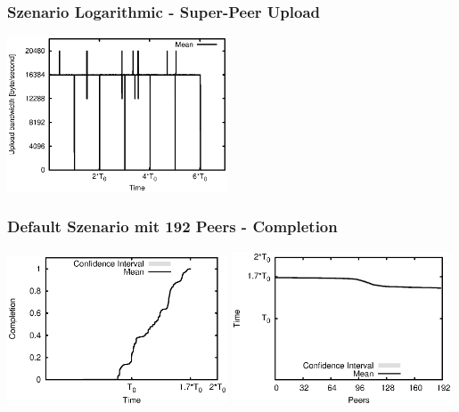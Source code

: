 \begin{frame}
  \frametitle{Szenario Logarithmic - Super-Peer Upload}
  \begin{center}
    \includegraphics[width=0.49\textwidth]{fig/plots/scenario_3_log/plots/GeneratedMeanCurrentSuperSeederUploadBandwidth.csv.eps}
  \end{center}
\end{frame}



\begin{frame}
  \frametitle{Default Szenario mit 192 Peers - Completion}
  \begin{center}
    \includegraphics[width=0.49\textwidth]{fig/plots/scenario_11_peer_count_192_v2/plots/GeneratedMeanChunkCompletion.csv.eps}
    \hfill
    \includegraphics[width=0.49\textwidth]{fig/plots/scenario_11_peer_count_192_v2/plots/GeneratedMeanSortedChunkCompletion.csv.eps}
  \end{center}
\end{frame}


